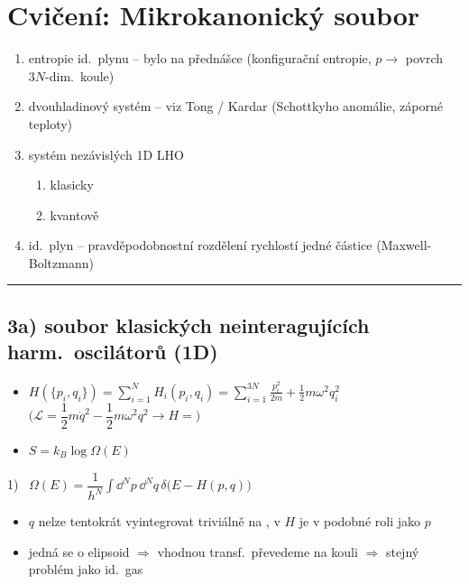 \section{Cvičení: Mikrokanonický soubor}

\begin{priklad}[Zadání]
\begin{enumerate}[label=\arabic*)]
  \item entropie id.\ plynu -- bylo na přednášce (konfigurační entropie, $p\to$ povrch $3N$-dim.\ koule)
  \item dvouhladinový systém -- viz Tong / Kardar (Schottkyho anomálie, záporné teploty)
  \item systém nezávislých 1D LHO
  \begin{enumerate}[label=\alph*)]
    \item klasicky
    \item kvantově
  \end{enumerate}
  \item id.\ plyn -- pravděpodobnostní rozdělení rychlostí jedné částice (Maxwell-Boltzmann)
\end{enumerate}
\end{priklad}

\noindent\rule{\linewidth}{0.4pt}

{\color{NavyBlue}
\subsection*{3a) soubor klasických neinteragujících harm.\ oscilátorů (1D)}
\begin{itemize}
  \item $H(\{p_i,q_i\}) = \displaystyle\sum_{i=1}^{N}H_i(p_i,q_i) = \sum_{i=1}^{3N}\frac{p_i^2}{2m} + \frac12m\omega^2q_i^2$
         \\
        $\Big(\mathcal{L} = \dfrac12m\dot q^2 - \dfrac12m\omega^2q^2 \to H = \Big)$
  \item $S = k_B\log\Omega(E)$
\end{itemize}
1) \ $\Omega(E) = \dfrac{1}{h^N}\displaystyle\int\dd^Np\,\dd^Nq\,\delta\big(E - H(p,q)\big)$
\begin{itemize}[nosep]
  \item $q$ nelze tentokrát vyintegrovat triviálně na , v $H$ je v podobné roli jako $p$
  \item jedná se o elipsoid $\Rightarrow$ vhodnou transf.\ převedeme na kouli $\Rightarrow$ stejný problém jako id.\ gas
\end{itemize}}

